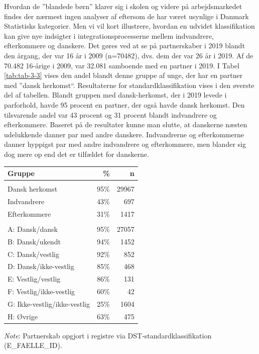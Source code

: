 \documentclass[
]{book}
\begin{document}
Hvordan de ''blandede børn'' klarer sig i skolen og videre på arbejdsmarkedet findes der nærmest ingen analyser af eftersom de har været usynlige i Danmark Statistisks kategorier. Men vi vil kort illustrere, hvordan en udvidet klassifikation kan give nye indsigter i integrationsprocesserne mellem indvandrere, efterkommere og danskere. Det gøres ved at se på partnerskaber i 2019 blandt den årgang, der var 16 år i 2009 (n=70482), dvs. dem der var 26 år i 2019. Af de 70.482 16-årige i 2009, var 32.081 samboende med en partner i 2019. I Tabel \ref{tab:tab-3-3} vises den andel blandt denne gruppe af unge, der har en partner med ''dansk herkomst``. Resultaterne for standardklassifikation vises i den øverste del af tabellen. Blandt gruppen med dansk-herkomst, der i 2019 levede i parforhold, havde 95 procent en partner, der også havde dansk herkomst. Den tilsvarende andel var 43 procent og 31 procent blandt indvandrere og efterkommere. Baseret på de resultater kunne man slutte, at danskerne næsten udelukkende danner par med andre danskere. Indvandrerne og efterkommerne danner hyppigst par med andre indvandrere og efterkommere, men blander sig dog mere op end det er tilfældet for danskerne.

\setlength{\LTpost}{0mm}
\begin{longtable}{lrr}
\toprule
Gruppe & \% & n \\ 
\midrule\addlinespace[2.5pt]
\multicolumn{3}{l}{Standardklassifikation} \\ 
\midrule\addlinespace[2.5pt]
Dansk herkomst & 95\% & 29967 \\ 
Indvandrere & 43\% & 697 \\ 
Efterkommere & 31\% & 1417 \\ 
\midrule\addlinespace[2.5pt]
\multicolumn{3}{l}{Udvidet klassifikation} \\ 
\midrule\addlinespace[2.5pt]
A: Dansk/dansk & 95\% & 27057 \\ 
B: Dansk/ukendt & 94\% & 1452 \\ 
C: Dansk/vestlig & 92\% & 852 \\ 
D: Dansk/ikke-vestlig & 85\% & 468 \\ 
E: Vestlig/vestlig & 86\% & 131 \\ 
F: Vestlig/ikke-vestlig & 60\% & 42 \\ 
G: Ikke-vestlig/ikke-vestlig & 25\% & 1604 \\ 
H: Øvrige & 63\% & 475 \\ 
\bottomrule
\end{longtable}
\begin{minipage}{\linewidth}
\emph{Note}: Partnerskab opgjort i registre via DST-standardklassifikation (E\_FAELLE\_ID).\\
\end{minipage}
\end{document}
